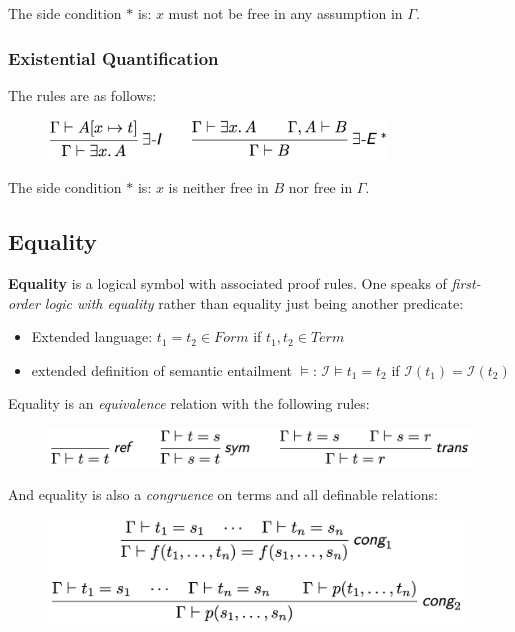 \documentclass[a4paper]{extarticle}
\begin{document}
The side condition \(*\) is: \(x\) must not be free in any assumption in \(\Gamma\).

\subsubsection{Existential Quantification}

The rules are as follows:

\begin{figure}[H]
    \includegraphics[width=9cm]{../images/FMFP_Fig2-3}
    \centering
\end{figure}

The side condition \(*\) is: \(x\) is neither free in \(B\) nor free in \(\Gamma\).

\subsection{Equality}

\textbf{Equality} is a logical symbol with associated proof rules. One speaks of \textit{first-order logic with equality} rather than equality just being another predicate:

\begin{itemize}
    \item Extended language: \(t_1 = t_2 \in Form\) if \(t_1, t_2 \in Term\)
    \item extended definition of semantic entailment \(\vDash\): \(\mathcal{I} \vDash t_1 = t_2\) if \(\mathcal{I}(t_1) = \mathcal{I}(t_2)\)
\end{itemize}

Equality is an \textit{equivalence} relation with the following rules:

\begin{figure}[H]
    \includegraphics[width=12cm]{../images/FMFP_Fig2-4}
    \centering
\end{figure}

And equality is also a \textit{congruence} on terms and all definable relations:

\begin{figure}[H]
    \includegraphics[width=11cm]{../images/FMFP_Fig2-5}
    \centering
\end{figure}
\end{document}
